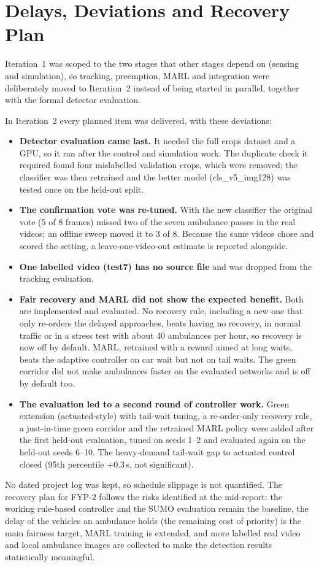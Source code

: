 \section{Delays, Deviations and Recovery Plan}
Iteration~1 was scoped to the two stages that other stages depend on (sensing and simulation), so tracking,
preemption, MARL and integration were deliberately moved to Iteration~2 instead of being started in parallel,
together with the formal detector evaluation.

In Iteration~2 every planned item was delivered, with these deviations:
\begin{itemize}
\item \textbf{Detector evaluation came last.} It needed the full crops dataset and a GPU, so it ran after the
control and simulation work. The duplicate check it required found four mislabelled validation crops, which were
removed; the classifier was then retrained and the better model (cls\_v5\_img128) was tested once on the held-out
split.
\item \textbf{The confirmation vote was re-tuned.} With the new classifier the original vote (5 of 8 frames)
missed two of the seven ambulance passes in the real videos; an offline sweep moved it to 3 of 8. Because the same
videos chose and scored the setting, a leave-one-video-out estimate is reported alongside.
\item \textbf{One labelled video (test7) has no source file} and was dropped from the tracking evaluation.
\item \textbf{Fair recovery and MARL did not show the expected benefit.} Both are implemented and evaluated.
No recovery rule, including a new one that only re-orders the delayed approaches, beats having no recovery,
in normal traffic or in a stress test with about 40 ambulances per hour, so recovery is now off by default. MARL,
retrained with a reward aimed at long waits, beats the adaptive controller on car wait but not on tail waits.
The green corridor did not make ambulances faster on the evaluated networks and is off by default too.
\item \textbf{The evaluation led to a second round of controller work.} Green extension (actuated-style) with
tail-wait tuning, a re-order-only recovery rule, a just-in-time green corridor and the retrained MARL policy were
added after the first held-out evaluation, tuned on seeds 1--2 and evaluated again on the held-out seeds 6--10.
The heavy-demand tail-wait gap to actuated control closed (95th percentile $+0.3$\,s, not significant).
\end{itemize}
No dated project log was kept, so schedule slippage is not quantified. The recovery plan for FYP-2 follows the
risks identified at the mid-report: the working rule-based controller and the SUMO evaluation remain the
baseline, the delay of the vehicles an ambulance holds (the remaining cost of priority) is the main fairness
target, MARL training is extended, and more labelled real video and local ambulance images are collected to
make the detection results statistically meaningful.
